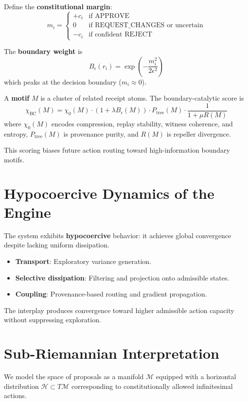 \documentclass[11pt,a4paper]{article}
\begin{document}
Define the \textbf{constitutional margin}:
\[
m_i =
\begin{cases}
+c_i & \text{if APPROVE} \\
0   & \text{if REQUEST\_CHANGES or uncertain} \\
-c_i & \text{if confident REJECT}
\end{cases}
\]

The \textbf{boundary weight} is
\[
B_\epsilon(r_i) = \exp\left( -\frac{m_i^2}{2\epsilon^2} \right)
\]
which peaks at the decision boundary ($m_i \approx 0$).

A \textbf{motif} $M$ is a cluster of related receipt atoms. The boundary-catalytic score is
\[
\chi_{\text{BC}}(M) = \chi_0(M) \cdot (1 + \lambda B_\epsilon(M)) \cdot P_{\text{tree}}(M) \cdot \frac{1}{1 + \mu R(M)}
\]
where $\chi_0(M)$ encodes compression, replay stability, witness coherence, and entropy, $P_{\text{tree}}(M)$ is provenance purity, and $R(M)$ is repeller divergence.

This scoring biases future action routing toward high-information boundary motifs.

\section{Hypocoercive Dynamics of the Engine}

The system exhibits \textbf{hypocoercive} behavior: it achieves global convergence despite lacking uniform dissipation.

\begin{itemize}
    \item \textbf{Transport}: Exploratory variance generation.
    \item \textbf{Selective dissipation}: Filtering and projection onto admissible states.
    \item \textbf{Coupling}: Provenance-based routing and gradient propagation.
\end{itemize}

The interplay produces convergence toward higher admissible action capacity without suppressing exploration.

\section{Sub-Riemannian Interpretation}

We model the space of proposals as a manifold $\mathcal{M}$ equipped with a horizontal distribution $\mathcal{H} \subset T\mathcal{M}$ corresponding to constitutionally allowed infinitesimal actions.
\end{document}
